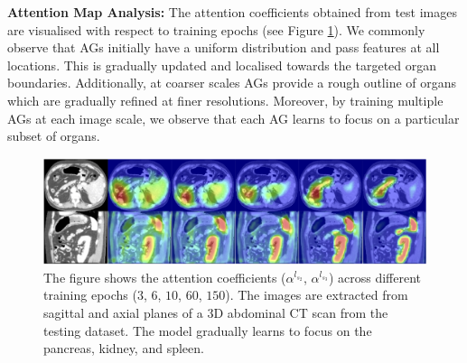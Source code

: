 \documentclass{article}
\begin{document}
\textbf{Attention Map Analysis:} The attention coefficients obtained from test images are visualised with respect to training epochs (see Figure \ref{fig:attentions_vs_epochs}). We commonly observe that AGs initially have a uniform distribution and pass features at all locations. This is gradually updated and localised towards the targeted organ boundaries. Additionally, at coarser scales AGs provide a rough outline of organs which are gradually refined at finer resolutions. Moreover, by training multiple AGs at each image scale, we observe that each AG learns to focus on a particular subset of organs. 

\begin{figure}[!t]
	\centering
	\includegraphics[width=1.00\textwidth]{figure2.png}
	\caption{The figure shows the attention coefficients ($\alpha^{l_{s_2}}$, $\alpha^{l_{s_3}}$) across different training epochs ($3$, $6$, $10$, $60$, $150$). The images are extracted from sagittal and axial planes of a 3D abdominal CT scan from the testing dataset. The model gradually learns to focus on the pancreas, kidney, and spleen.}
	\label{fig:attentions_vs_epochs}
\end{figure}
\end{document}
